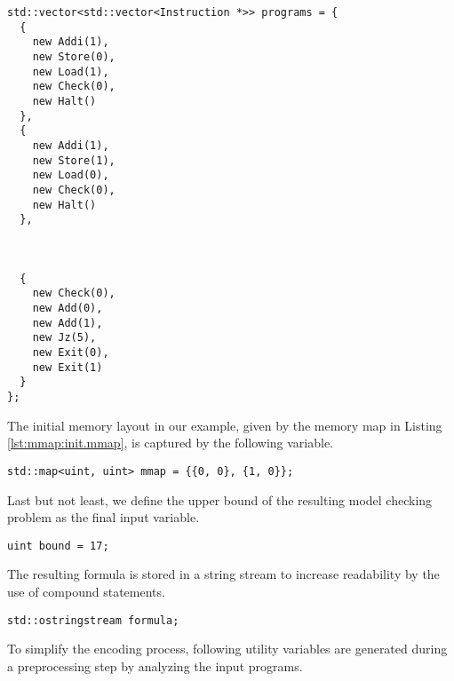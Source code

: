 \begin{lstlisting}[style=c++]
std::vector<std::vector<Instruction *>> programs = {
  {
    new Addi(1),
    new Store(0),
    new Load(1),
    new Check(0),
    new Halt()
  },
  {
    new Addi(1),
    new Store(1),
    new Load(0),
    new Check(0),
    new Halt()
  },



  {
    new Check(0),
    new Add(0),
    new Add(1),
    new Jz(5),
    new Exit(0),
    new Exit(1)
  }
};
\end{lstlisting}
The initial memory layout in our example, given by the memory map in Listing \ref{lst:mmap:init.mmap}, is captured by the following variable.
\begin{lstlisting}[style=c++]
std::map<uint, uint> mmap = {{0, 0}, {1, 0}};
\end{lstlisting}
Last but not least, we define the upper bound of the resulting model checking problem as the final input variable.
\begin{lstlisting}[style=c++]
uint bound = 17;
\end{lstlisting}
The resulting formula is stored in a string stream to increase readability by the use of compound statements.
\begin{lstlisting}[style=c++]
std::ostringstream formula;
\end{lstlisting}
To simplify the encoding process, following utility variables are generated during a preprocessing step by analyzing the input programs.
